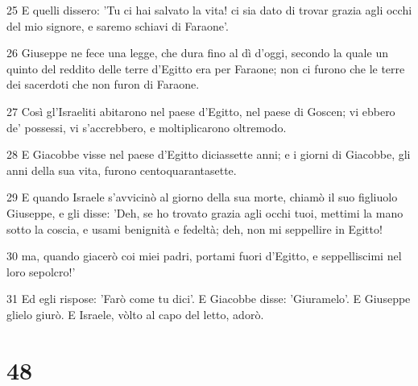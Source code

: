\par 25 E quelli dissero: 'Tu ci hai salvato la vita! ci sia dato di trovar grazia agli occhi del mio signore, e saremo schiavi di Faraone'.
\par 26 Giuseppe ne fece una legge, che dura fino al dì d'oggi, secondo la quale un quinto del reddito delle terre d'Egitto era per Faraone; non ci furono che le terre dei sacerdoti che non furon di Faraone.
\par 27 Così gl'Israeliti abitarono nel paese d'Egitto, nel paese di Goscen; vi ebbero de' possessi, vi s'accrebbero, e moltiplicarono oltremodo.
\par 28 E Giacobbe visse nel paese d'Egitto diciassette anni; e i giorni di Giacobbe, gli anni della sua vita, furono centoquarantasette.
\par 29 E quando Israele s'avvicinò al giorno della sua morte, chiamò il suo figliuolo Giuseppe, e gli disse: 'Deh, se ho trovato grazia agli occhi tuoi, mettimi la mano sotto la coscia, e usami benignità e fedeltà; deh, non mi seppellire in Egitto!
\par 30 ma, quando giacerò coi miei padri, portami fuori d'Egitto, e seppelliscimi nel loro sepolcro!'
\par 31 Ed egli rispose: 'Farò come tu dici'. E Giacobbe disse: 'Giuramelo'. E Giuseppe glielo giurò. E Israele, vòlto al capo del letto, adorò.

\chapter{48}

